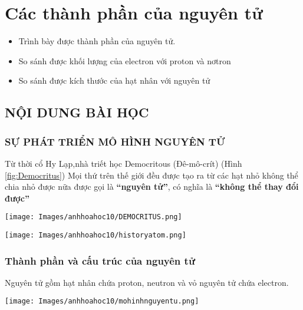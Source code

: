 
\dongkeex
\dongkebt
\section{Các thành phần của nguyên tử}
\begin{Muctieu}
	\begin{itemize}
		\item Trình bày được thành phần của nguyên tử.
		\item So sánh được khối lượng của electron với proton và nơtron
		\item So sánh được kích thước của hạt nhân với nguyên tử
	\end{itemize}
\end{Muctieu}
\subsection{NỘI DUNG BÀI HỌC}
\subsubsection{SỰ PHÁT TRIỂN MÔ HÌNH NGUYÊN TỬ}
\begin{tomtat}
	\begin{minipage}[htp!]{0.5\textwidth}
		Từ thời cổ Hy Lạp,nhà triết học Democritous (Đê-mô-crít) (Hình \ref{fig:Democritus})
		Mọi thứ trên thế giới đều được tạo ra từ các hạt nhỏ không thể chia nhỏ được nữa được gọi là \textbf{“nguyên tử”}, có nghĩa là \textbf{“không thể thay đổi được”}
	\end{minipage}
	\begin{minipage}[htp!]{0.5\textwidth}
		\begin{center}
			\texttt{[image: Images/anhhoahoc10/DEMOCRITUS.png]}
		\end{center}
	\end{minipage}
	
	\begin{center}
		\texttt{[image: Images/anhhoahoc10/historyatom.png]}
	\end{center}
\end{tomtat}
\subsubsection{Thành phần và cấu trúc của nguyên tử}
\vspace{0.5cm}
\begin{tomtat}
	Nguyên tử gồm hạt nhân chứa proton, neutron và vỏ nguyên tử chứa electron.
	\begin{center}
		\texttt{[image: Images/anhhoahoc10/mohinhnguyentu.png]}
	\end{center}
\end{tomtat}
